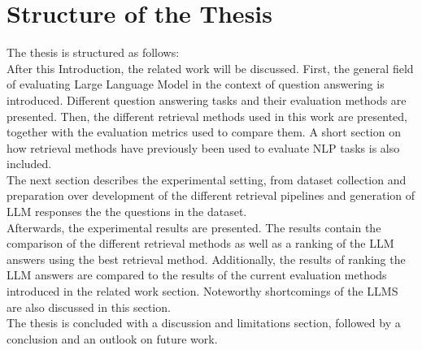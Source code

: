 \section{Structure of the Thesis}\label{sec:structure-of-the-thesis}
The thesis is structured as follows:\\
After this Introduction, the related work will be discussed.
First, the general field of evaluating Large Language Model in the context of question answering is introduced.
Different question answering tasks and their evaluation methods are presented.
Then, the different retrieval methods used in this work are presented, together with the evaluation metrics used to compare them.
A short section on how retrieval methods have previously been used to evaluate NLP tasks is also included.
\\
The next section describes the experimental setting, from dataset collection and preparation over development of the different retrieval pipelines and generation of LLM responses the the questions in the dataset.
\\
Afterwards, the experimental results are presented. The results contain the comparison of the different retrieval methods as well as a ranking of the LLM answers using the best retrieval method.
Additionally, the results of ranking the LLM answers are compared to the results of the current evaluation methods introduced in the related work section.
Noteworthy shortcomings of the LLMS are also discussed in this section.
\\
The thesis is concluded with a discussion and limitations section, followed by a conclusion and an outlook on future work.